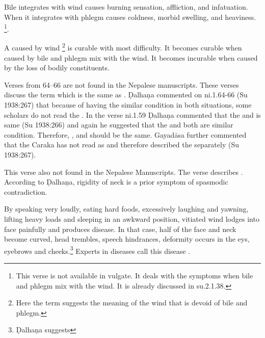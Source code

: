 \begin{translation}
\item[62.1] Bile integrates with wind causes burning sensation, affliction, and infatuation. When it integrates with phlegm causes coldness, morbid swelling, and heaviness. \footnote{This verse is not available in vulgate. It deals with the symptoms when bile and phlegm mix with the wind. It is already discussed in su.2.1.38.}. 

\item[63] A  caused by wind \footnote{Here the term 
 suggests the meaning of the wind that is devoid of bile and 
phlegm.} is curable with most difficulty. It becomes curable when caused by bile 
and phlegm mix with the wind. It becomes incurable when caused by the loss of 
bodily constituents.

\item[64--66] Verses from 64--66 are not found in the Nepalese manuscripts. 
These verses discuss the term  
which is the same as . Ḍalhaṇa commented on ni.1.64-66 (Su 
1938:267) that because of having the similar condition in both situations, some 
scholars do not read the . In the verse ni.1.59 Ḍalhaṇa 
commented that the  and  is same (Su 1938:266) and 
again he suggested that the  and  both are similar 
condition. Therefore, ,  and  should be 
the same. Gayadāsa further commented that the Caraka has not read 
 as  and therefore described the  
separately (Su 1938:267).

\item[67] This verse also not found in the Nepalese Manuscripts. The verse 
describes . According to Ḍalhaṇa, rigidity 
of neck is a prior symptom of spasmodic contradiction. 

\item[68--72] By speaking very loudly, eating hard foods, excessively laughing 
and yawning, lifting heavy loads and sleeping in an awkward position, vitiated 
wind lodges into face painfully and produces  disease. In that case, half of the face and neck become curved, head 
trembles, speech hindrances, deformity occurs in the eys, eyebrows and 
cheeks.\footnote{Ḍalhaṇa suggests } Experts in diseases call this disease . 


\end{translation}
